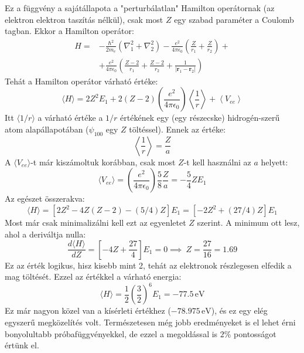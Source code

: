 \documentclass[../main.tex]{subfiles}
\begin{document}
Ez a függvény a sajátállapota a "perturbálatlan" Hamilton operátornak (az elektron elektron taszítás nélkül), csak most $Z$ egy szabad paraméter a Coulomb tagban. Ekkor a Hamilton operátor:
\begin{equation}
    \begin{aligned}
        H = &-\frac{\hbar^2}{2m_e} (\nabla_1^2 + \nabla_2^2) - \frac{e^2}{4\pi \epsilon_0} \left(\frac{Z}{r_1} + \frac{Z}{r_2}\right) + \\
        &+ \frac{e^2}{4\pi \epsilon_0} \left(\frac{Z - 2}{r_1} + \frac{Z - 2}{r_2} + \frac{1}{|\mathbf{r}_1 - \mathbf{r}_2|}\right)
    \end{aligned}
\end{equation}
Tehát a Hamilton operátor várható értéke:
\begin{equation}
    \langle H \rangle = 2 Z^2 E_1 + 2 (Z - 2) \left( \frac{e^2}{4 \pi \epsilon_0} \right) \left\langle \frac{1}{r} \right\rangle + \left\langle V_{ee} \right\rangle
\end{equation}
Itt $\langle 1/r \rangle$ a várható értéke a $1/r$ értékének egy (egy részecske) hidrogén-szerű atom alapállapotában ($\psi_{100}$ egy $Z$ töltéssel). Ennek az értéke:
\begin{equation}
    \left\langle \frac{1}{r} \right\rangle = \frac{Z}{a}
\end{equation} 
A $\langle V_{ee} \rangle$-t már kiszámoltuk korábban, csak most $Z$-t kell használni az $a$ helyett:
\begin{equation}
    \langle V_{ee} \rangle = \left(\frac{e^2}{4 \pi \epsilon_0}\right) \frac{5}{8} \frac{Z}{a} = -\frac{5}{4} Z E_1
\end{equation}
Az egészet összerakva:
\begin{equation}
    \langle H \rangle = \left[2Z^2 - 4Z(Z - 2) - (5/4)Z\right]E_1 = \left[-2Z^2 + (27/4)Z\right]E_1
\end{equation}
Most már csak minimalizálni kell ezt az egyenletet $Z$ szerint. A minimum ott lesz, ahol a deriváltja nulla:
\begin{equation}
    \frac{d \langle H \rangle}{dZ} = \left[-4Z + \frac{27}{4}\right] E_1 = 0 \implies \ Z = \frac{27}{16} = 1.69
\end{equation}
Ez az érték logikus, hisz kisebb mint 2, tehát az elektronok részlegesen elfedik a mag töltését. Ezzel az értékkel a várható energia:
\begin{equation}
    \langle H \rangle = \frac{1}{2} \left(\frac{3}{2}\right)^6 E_1 = -77.5 \, \text{eV}
\end{equation}
Ez már nagyon közel van a kísérleti értékhez ($-78.975 \, \text{eV}$), és ez egy elég egyszerű megközelítés volt. Természetesen még jobb eredményeket is el lehet érni bonyolultabb próbafüggvényekkel, de ezzel 
a megoldással is $2\%$ pontosságot értünk el.
\end{document}
